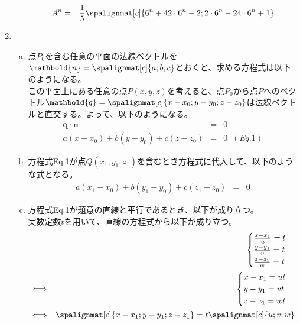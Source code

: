 \documentclass[dvipdfmx,titlepage, 11pt, a4paper]{jsarticle}%
\begin{document}
\begin{enumerate}[(1)]
\begin{enumerate}[(a)]
\begin{eqnarray*}
      A^n &=& \frac{1}{5}\spalignmat[c]{
        {6^n + 4} {2\cdot 6^n - 2};
        {2\cdot 6^n - 2} {4\cdot 6^n + 1}
      }
    \end{eqnarray*}
  \end{enumerate}
  \item 
  \begin{enumerate}[(a)]
    \item 点$P_0$を含む任意の平面の法線ベクトルを$\mathbold{n} = \spalignmat[c]{
      {a};
      {b};
      {c}
    }$とおくと、求める方程式は以下のようになる。\\
    この平面上にある任意の点$P(x, y, z)$を考えると、点$P_0$から点$P$へのベクトル$\mathbold{q} = \spalignmat[c]{
      {x - x_0};
      {y - y_0};
      {z - z_0}
    }$は法線ベクトルと直交する。よって、以下のようになる。
    \begin{eqnarray*}
      \mathbold{q}\cdot\mathbold{n} &=& 0\\
      a(x - x_0) + b(y - y_0) + c(z - z_0) &=& 0 \;\;(Eq.1)
    \end{eqnarray*}
    \item 方程式Eq.1が点$Q(x_1, y_1, z_1)$を含むとき方程式に代入して、以下のような式となる。
    \begin{eqnarray*}
      a(x_1 - x_0) + b(y_1 - y_0) + c(z_1 - z_0) &=& 0      
    \end{eqnarray*}
    \item 方程式Eq.1が題意の直線と平行であるとき、以下が成り立つ。\\
    実数定数$t$を用いて、直線の方程式から以下が成り立つ。
    \begin{eqnarray*}
      &&\begin{cases}
        \frac{x - x_1}{u} = t\\
        \frac{y - y_1}{v} = t\\
        \frac{z - z_1}{w} = t\\
      \end{cases}\\
      &\Longleftrightarrow&
      \begin{cases}
        x - x_1 = ut\\
        y - y_1 = vt\\
        z - z_1 = wt\\
      \end{cases}\\
      &\Longleftrightarrow&
      \spalignmat[c]{
        {x - x_1};
        {y - y_1};
        {z - z_1}
      } = t
      \spalignmat[c]{
        {u};
        {v};
        {w}
}
\end{eqnarray*}
\end{enumerate}
\end{enumerate}
\end{document}
